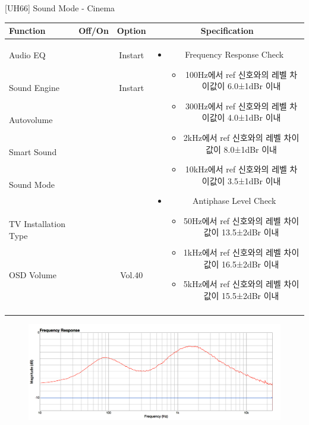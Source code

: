 \begin{frame}[t]{[UH66] Sound Mode - Cinema}
\begin{tiny}
\begin{tabular}{@{}lccc@{}}
\toprule
Function & Off/On & Option & Specification \\
\midrule
Audio EQ & \color{black}{Off} & Instart &
\multirow{10}{60mm}{
\begin{itemize}
\item Frequency Response Check
	\begin{itemize}
	\item 100Hz에서 ref 신호와의 레벨 차이값이 6.0±1dBr 이내
	\item 300Hz에서 ref 신호와의 레벨 차이값이 4.0±1dBr 이내
	\item 2kHz에서 ref 신호와의 레벨 차이값이 8.0±1dBr 이내
	\item 10kHz에서 ref 신호와의 레벨 차이값이 3.5±1dBr 이내
	\end{itemize}
\item Antiphase Level Check
	\begin{itemize}
	\item 50Hz에서 ref 신호와의 레벨 차이값이 13.5±2dBr 이내
	\item 1kHz에서 ref 신호와의 레벨 차이값이 16.5±2dBr 이내
	\item 5kHz에서 ref 신호와의 레벨 차이값이 15.5±2dBr 이내
	\end{itemize}
\end{itemize}
} \\
Sound Engine & \color{blue}{On} & Instart & \\
Autovolume & \color{black}{Off} & & \\
Smart Sound & \color{black}{Off} & & \\
Sound Mode & \color{blue}{On} & \color{blue}{Cinema} & \\
TV Installation Type & \color{blue}{On} & \color{black}{Standtype1} & \\
OSD Volume & \color{blue}{On} & Vol.40 & \\
& & & \\
& & & \\
& & & \\
& & & \\
\midrule
\end{tabular}
\end{tiny}

\begin{figure}[b]
\includegraphics[height=0.3\textwidth]{figures/cinema.png}
\end{figure}

\end{frame}
